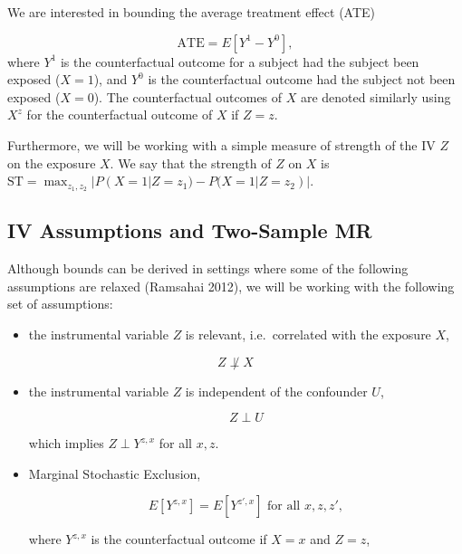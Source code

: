 \documentclass[
]{article}
\providecommand{\tightlist}{%
  \setlength{\itemsep}{0pt}\setlength{\parskip}{0pt}}
\theoremstyle{plain}
\begin{document}
We are interested in bounding the average treatment effect (ATE)

\[
\text{ATE} = E[Y^1 - Y^0],
\]
where \(Y^1\) is the counterfactual outcome for a subject had the subject been exposed (\(X = 1\)), and \(Y^0\) is the counterfactual outcome had the subject not been exposed (\(X = 0\)). The counterfactual outcomes of \(X\) are denoted similarly using \(X^z\) for the counterfactual outcome of \(X\) if \(Z = z\).

Furthermore, we will be working with a simple measure of strength of the IV \(Z\) on the exposure \(X\). We say that the strength of \(Z\) on \(X\) is \(\text{ST} = \max_{z_1,z_2} | P(X = 1 | Z = z_1) - P(X = 1 | Z = z_2) |\).

\hypertarget{iv-assumptions-and-two-sample-mr}{%
\subsection{IV Assumptions and Two-Sample MR}\label{iv-assumptions-and-two-sample-mr}}

Although bounds can be derived in settings where some of the following assumptions are relaxed (Ramsahai 2012), we will be working with the following set of assumptions:

\begin{itemize}
\tightlist
\item
  the instrumental variable \(Z\) is relevant, i.e.~correlated with the exposure \(X\),
\end{itemize}

\begin{equation}
  Z \not\perp X \label{eq:z_cor_x}\tag{A1}
\end{equation}

\begin{itemize}
\item
  the instrumental variable \(Z\) is independent of the confounder \(U\),

  \begin{equation}
    Z \perp U \tag{A2} \label{eq:marg-exch}  %
  \end{equation}

  which implies \(Z \perp Y^{z,x}\) for all \(x,z\).
\item
  Marginal Stochastic Exclusion,

  \begin{equation}
  E[Y^{z,x}] = E[Y^{z',x}] \text{ for all } x,z,z', \label{eq:marg-stoch-excl}\tag{A3}
  \end{equation}

  where \(Y^{z,x}\) is the counterfactual outcome if \(X = x\) and \(Z = z\),
\end{itemize}
\end{document}
